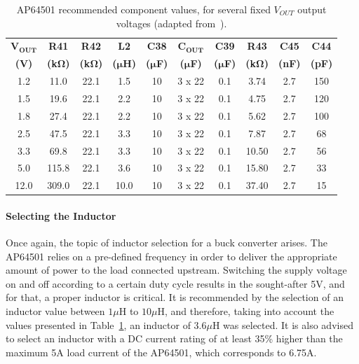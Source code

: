 \begingroup
\begin{table}[h]
    \caption{AP64501 recommended component values, for several fixed $V_{OUT}$ output voltages (adapted from~\cite{AP64501}).}
    \label{tab:AP64501_recommended_values}
    \centering%
	\begin{tabular}{cccccccccc}
        \toprule
        $\mathbf{V_{OUT}}$ & \textbf{R41} 						    & \textbf{R42} 							  & \textbf{L2} 						& \textbf{C38} 						  & $\mathbf{C_{OUT}}$ 					& \textbf{C39} 						  & \textbf{R43} 						   & \textbf{C45}  & \textbf{C44} \\
       	\textbf{(V)} 	   & \textbf{(k}$\mathbf{\Omega}$\textbf{)} & \textbf{(k}$\mathbf{\Omega}$\textbf{)}  & \textbf{(}$\mathbf{\mu}$\textbf{H)} & \textbf{(}$\mathbf{\mu}$\textbf{F)} & \textbf{(}$\mathbf{\mu}$\textbf{F)} & \textbf{(}$\mathbf{\mu}$\textbf{F)} & \textbf{(k}$\mathbf{\Omega}$\textbf{)} & \textbf{(nF)} & \textbf{(pF)} \\
        \midrule
		1.2 & 11.0 & 22.1 & 1.5 & 10& 3 x 22 & 0.1 & 3.74 & 2.7 & 150 \\
		\midrule
		1.5 & 19.6 & 22.1 & 2.2 & 10& 3 x 22 & 0.1 & 4.75 & 2.7 & 120 \\
		\midrule
		1.8 & 27.4 & 22.1 & 2.2 & 10& 3 x 22 & 0.1 & 5.62 & 2.7 & 100 \\
		\midrule
		2.5 & 47.5 & 22.1 & 3.3 & 10& 3 x 22 & 0.1 & 7.87 & 2.7 & 68 \\
		\midrule
		3.3 & 69.8 & 22.1 & 3.3 & 10& 3 x 22 & 0.1 & 10.50 & 2.7 & 56 \\
		\midrule
        5.0 & 115.8 & 22.1 & 3.6 & 10 & 3 x 22 & 0.1 & 15.80 & 2.7 & 33 \\
		\midrule
	    12.0 & 309.0 & 22.1 & 10.0 & 10 & 3 x 22 & 0.1 & 37.40 & 2.7 & 15 \\
		\bottomrule
	\end{tabular}
\end{table}
\endgroup

\paragraph{Selecting the Inductor}	Once again, the topic of inductor selection for a buck converter arises. The AP64501 relies on a pre-defined frequency in order to deliver the appropriate amount of power to the load connected upstream.
Switching the supply voltage on and off according to a certain duty cycle results in the sought-after 5V, and for that, a proper inductor is critical. It is recommended by \cite{AP64501} the selection of an inductor value between $1 \mu$H to $10 \mu$H, and therefore, taking into account the values presented in Table~\ref{tab:AP64501_recommended_values}, an inductor of $3.6 \mu$H was selected. It is also advised to select an inductor with a DC current rating of at least 35\% higher than the maximum 5A load current of the AP64501, which corresponds to 6.75A.

